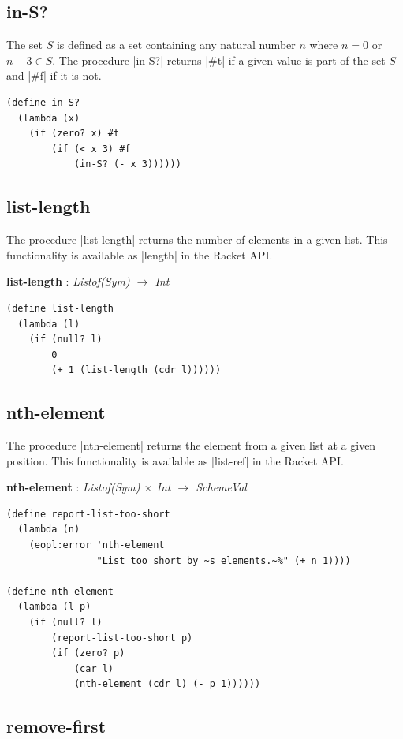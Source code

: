 \documentclass[a4paper]{article}
\begin{document}
\subsection{in-S?}

The set $S$ is defined as a set containing any natural number $n$ where $n = 0$ or $n - 3 \in S$. The procedure |in-S?| returns |#t| if a given value is part of the set $S$ and |#f| if it is not.

\begin{lstlisting}
(define in-S?
  (lambda (x)
    (if (zero? x) #t
        (if (< x 3) #f
            (in-S? (- x 3))))))
\end{lstlisting}

\subsection{list-length}

The procedure |list-length| returns the number of elements in a given list. This functionality is available as |length| in the Racket API.

\textbf{list-length} : \textit{Listof(Sym) $\rightarrow$ Int}
\begin{lstlisting}[aboveskip=0pt]
(define list-length
  (lambda (l)
    (if (null? l)
        0
        (+ 1 (list-length (cdr l))))))
\end{lstlisting}

\subsection{nth-element}

The procedure |nth-element| returns the element from a given list at a given position. This functionality is available as |list-ref| in the Racket API.

\textbf{nth-element} : \textit{Listof(Sym) $\times$ Int $\rightarrow$ SchemeVal}
\begin{lstlisting}[aboveskip=0pt]
(define report-list-too-short
  (lambda (n)
    (eopl:error 'nth-element
                "List too short by ~s elements.~%" (+ n 1))))

(define nth-element
  (lambda (l p)
    (if (null? l)
        (report-list-too-short p)
        (if (zero? p)
            (car l)
            (nth-element (cdr l) (- p 1))))))
\end{lstlisting}

\subsection{remove-first}
\end{document}

